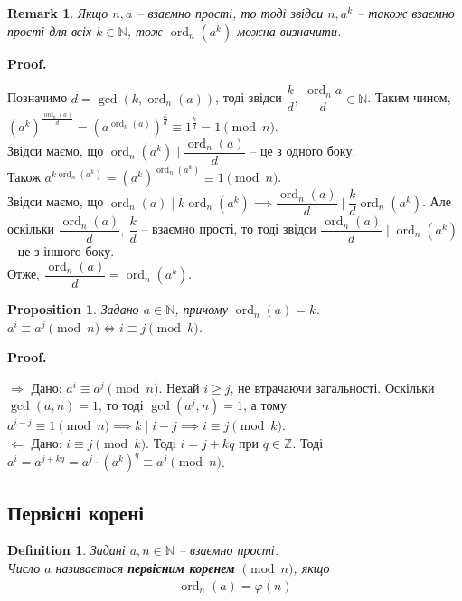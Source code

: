 \documentclass[a4paper, 10pt]{article}
\makeatletter
\theoremstyle{theoremdd}
\theoremstyle{theoremdd}
\newtheorem{definition}[theorem]{Definition}
\theoremstyle{theoremdd}
\theoremstyle{theoremdd}
\theoremstyle{theoremdd}
\newtheorem{proposition}[theorem]{Proposition}
\theoremstyle{theoremdd}
\newtheorem{remark}[theorem]{Remark}
\theoremstyle{theoremdd}
\theoremstyle{theoremdd}
\def\rightproof{$\boxed{\Rightarrow}$ }
\def\leftproof{$\boxed{\Leftarrow}$ }
\renewenvironment{proof}[1][Proof.\\]{\par
\pushQED{\hfill \qed}%
\normalfont \topsep6\p@\@plus6\p@\relax
\trivlist
\item\relax
{\bfseries
#1\@addpunct{.}}\hspace\labelsep\ignorespaces
}{%
\popQED\endtrivlist\@endpefalse
}
\DeclareMathOperator{\ord}{ord}
\makeatother
\begin{document}
\begin{remark}
Якщо $n,a$ -- взаємно прості, то тоді звідси $n,a^k$ -- також взаємно прості для всіх $k \in \mathbb{N}$, тож $\ord_n(a^k)$ можна визначити.
\end{remark}

\begin{proof}
Позначимо $d = \gcd(k,\ord_n (a))$, тоді звідси $\dfrac{k}{d},\ \dfrac{\ord_n a}{d} \in \mathbb{N}$. Таким чином,\\
$\left( a^k \right)^{\frac{\ord_n (a)}{d}} = \left( a^{\ord_n (a)} \right)^{\frac{k}{d}} \equiv 1^{\frac{k}{d}} = 1 \pmod n$.\\
Звідси маємо, що $\ord_n (a^k) \mid \dfrac{\ord_n (a)}{d}$ -- це з одного боку.\\
Також $a^{k \ord_n (a^k)} = (a^k)^{\ord_n (a^k)} \equiv 1 \pmod n$.\\
Звідси маємо, що $\ord_n (a) \mid k \ord_n (a^k) \implies \dfrac{\ord_n (a)}{d} \mid \dfrac{k}{d} \ord_n (a^k)$. Але оскільки $\dfrac{\ord_n (a)}{d},\ \dfrac{k}{d}$ -- взаємно прості, то тоді звідси $\dfrac{\ord_n (a)}{d} \mid \ord_n (a^k)$ -- це з іншого боку.\\
Отже, $\dfrac{\ord_n (a)}{d} = \ord_n (a^k)$.
\end{proof}

\begin{proposition}
\label{power_congruence_equation}
Задано $a \in \mathbb{N}$, причому $\ord_n (a) = k$.\\
$a^i \equiv a^j \pmod n \iff i \equiv j \pmod k$.
\end{proposition}

\begin{proof}
\rightproof Дано: $a^i \equiv a^j \pmod n$. Нехай $i \geq j$, не втрачаючи загальності. Оскільки $\gcd(a,n) = 1$, то тоді $\gcd(a^j,n)=1$, а тому\\
$a^{i-j} \equiv 1 \pmod n \implies k \mid i-j \implies i \equiv j \pmod k$.
\bigskip \\
\leftproof Дано: $i \equiv j \pmod k$. Тоді $i = j + k q$ при $q \in \mathbb{Z}$. Тоді\\
$a^i = a^{j+kq} = a^j \cdot (a^k)^q \equiv a^j \pmod n$.
\end{proof}

\subsection{Первісні корені}
\begin{definition}
Задані $a, n \in \mathbb{N}$ -- взаємно прості.\\
Число $a$ називається \textbf{первісним коренем} $\!\! \pmod n$, якщо
\begin{align*}
\ord_n(a) = \varphi(n)
\end{align*}
\end{definition}
\end{document}
